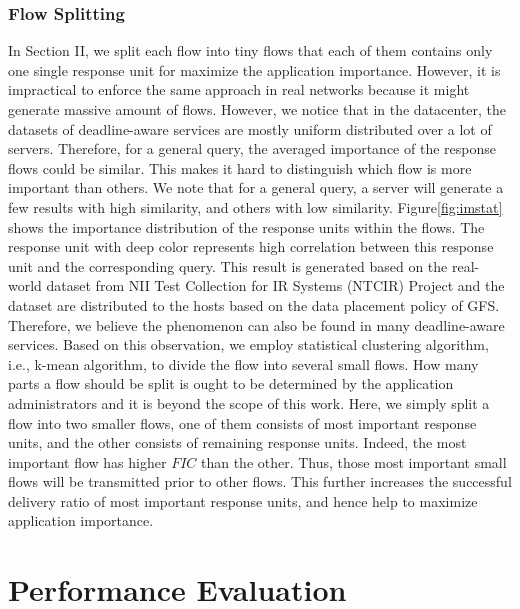 \documentclass[conference]{IEEEtran}
\begin{document}
\subsubsection{Flow Splitting}

In Section II, we split each flow into tiny flows that each of them contains only one single response unit for maximize the application importance. However, it is impractical to enforce the same approach in real networks because it might generate massive amount of flows. However, we notice that in the datacenter, the datasets of deadline-aware services are mostly uniform distributed over a lot of servers. Therefore, for a general query, the averaged importance of the response flows could be similar. This makes it hard to distinguish which flow is more important than others. We note that for a general query, a server will generate a few results with high similarity, and others with low similarity. Figure\ref{fig:imstat} shows the importance distribution of the response units within the flows. The response unit with deep color represents high correlation between this response unit and the corresponding query. This result is generated based on the real-world dataset from NII Test Collection for IR Systems (NTCIR) Project\cite{ntcir} and the dataset are distributed to the hosts based on the data placement policy of GFS\cite{gfs}. Therefore, we believe the phenomenon can also be found in many deadline-aware services. Based on this observation, we employ statistical clustering algorithm, i.e., k-mean algorithm, to divide the flow into several small flows. How many parts a flow should be split is ought to be determined by the application administrators and it is beyond the scope of this work. Here, we simply split a flow into two smaller flows, one of them consists of most important response units, and the other consists of remaining response units. Indeed, the most important flow has higher $FIC$ than the other. Thus, those most important small flows will be transmitted prior to other flows. This further increases the successful delivery ratio of most important response units, and hence help to maximize application importance.

\section{Performance Evaluation}
\end{document}
